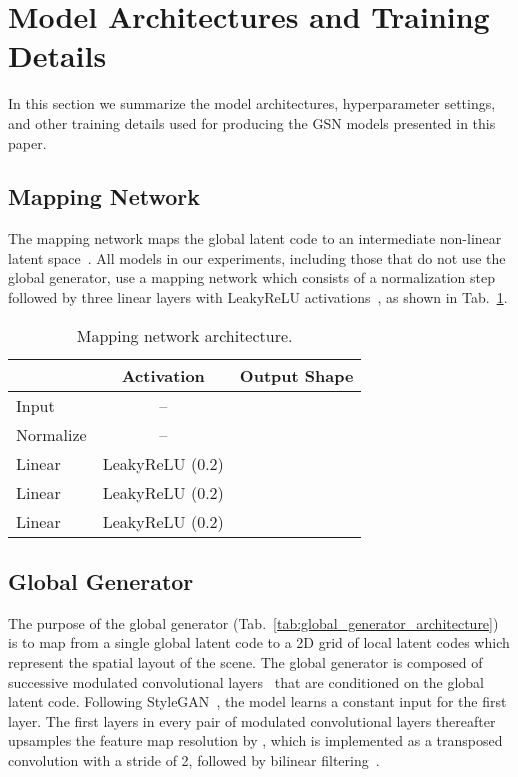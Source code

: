 \documentclass[10pt,twocolumn,letterpaper]{article}
\begin{document}
{\small


}

\clearpage
\appendix
\section{Model Architectures and Training Details} In this section we summarize the model architectures, hyperparameter settings, and other training details used for producing the GSN models presented in this paper.

\subsection{Mapping Network}
The mapping network maps the global latent code  to an intermediate non-linear latent space~\cite{stylegan}. All models in our experiments, including those that do not use the global generator, use a mapping network which consists of a normalization step followed by three linear layers with LeakyReLU activations~\cite{leakyrelu}, as shown in Tab.~\ref{tab:mapping_network_architecture}.

\begin{table}[h]
	\small
	\centering
	\begin{tabular}{lcc}
		\toprule
		& Activation & Output Shape \\
		\midrule
		Input  & -- &  \\
		Normalize & -- &  \\
		Linear & LeakyReLU (0.2) &  \\
		Linear & LeakyReLU (0.2) &  \\
		Linear & LeakyReLU (0.2) &  \\
		\bottomrule
	\end{tabular}
	\caption{Mapping network architecture.}
	\label{tab:mapping_network_architecture}
\end{table}

\subsection{Global Generator}

The purpose of the global generator (Tab.~\ref{tab:global_generator_architecture}) is to map from a single global latent code  to a 2D grid of local latent codes  which represent the spatial layout of the scene. The global generator is composed of successive modulated convolutional layers~\cite{stylegan2}
that are conditioned on the global latent code.
Following StyleGAN~\cite{stylegan}, the model learns a constant input for the first layer. The first layers in every pair of modulated convolutional layers thereafter upsamples the feature map resolution by , which is implemented as a transposed convolution with a stride of 2, followed by bilinear filtering~\cite{blur}. 
\end{document}
